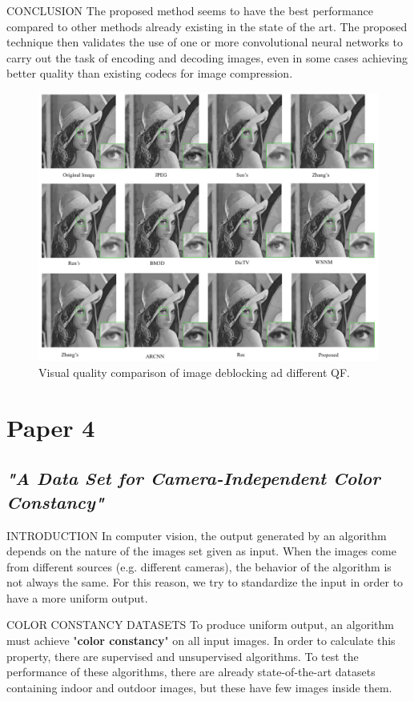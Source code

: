 \documentclass[10pt]{beamer}
\begin{document}
\begin{frame}{CONCLUSION}
    The proposed method seems to have the best performance compared to other 
    methods already existing in the state of the art. The proposed technique 
    then validates the use of one or more convolutional neural networks to carry 
    out the task of encoding and decoding images, even in some cases achieving 
    better quality than existing codecs for image compression.
    \begin{figure}[htbp]
        \centering
        \includegraphics[width = 0.5 \linewidth]{images/paper3/final.png}
        \centering
        \caption{Visual quality comparison of image deblocking ad different QF.}
        \label{fig:final comparison}
    \end{figure}
\end{frame}


\section{Paper 4}
\subsection{\emph{"A Data Set for Camera-Independent Color Constancy"}}

\begin{frame}{INTRODUCTION}
    In computer vision, the output generated by an algorithm depends on the 
    nature of the images set given as input. When the images come from 
    different sources (e.g. different cameras), the behavior of the algorithm is 
    not always the same. For this reason, we try to standardize the input in 
    order to have a more uniform output.
\end{frame}

\begin{frame}{COLOR CONSTANCY DATASETS}
    To produce uniform output, an algorithm must achieve "{\bfseries{color 
    constancy}}" on all input images. In order to calculate this property, there 
    are supervised and unsupervised algorithms. To test the performance of 
    these algorithms, there are already state-of-the-art datasets   
    containing indoor and outdoor images, but these have few images inside 
    them.
\end{frame}
\end{document}
